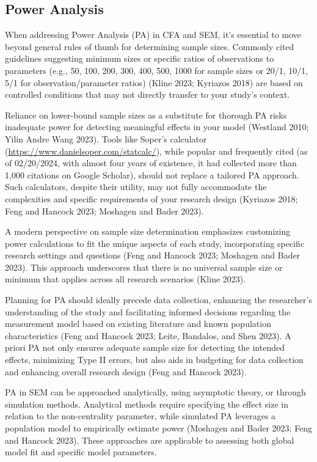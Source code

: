 \documentclass[
  a4paper,
]{article}
\begin{document}
\subsection{Power Analysis}\label{power-analysis}

When addressing Power Analysis (PA) in CFA and SEM, it's essential to
move beyond general rules of thumb for determining sample sizes.
Commonly cited guidelines suggesting minimum sizes or specific ratios of
observations to parameters (e.g., 50, 100, 200, 300, 400, 500, 1000 for
sample sizes or 20/1, 10/1, 5/1 for observation/parameter ratios) (Kline
2023; Kyriazos 2018) are based on controlled conditions that may not
directly transfer to your study's context.

Reliance on lower-bound sample sizes as a substitute for thorough PA
risks inadequate power for detecting meaningful effects in your model
(Westland 2010; Yilin Andre Wang 2023). Tools like Soper's calculator
(\url{https://www.danielsoper.com/statcalc/}), while popular and
frequently cited (as of 02/20/2024, with almost four years of existence,
it had collected more than 1,000 citations on Google Scholar), should
not replace a tailored PA approach. Such calculators, despite their
utility, may not fully accommodate the complexities and specific
requirements of your research design (Kyriazos 2018; Feng and Hancock
2023; Moshagen and Bader 2023).

A modern perspective on sample size determination emphasizes customizing
power calculations to fit the unique aspects of each study,
incorporating specific research settings and questions (Feng and Hancock
2023; Moshagen and Bader 2023). This approach underscores that there is
no universal sample size or minimum that applies across all research
scenarios (Kline 2023).

Planning for PA should ideally precede data collection, enhancing the
researcher's understanding of the study and facilitating informed
decisions regarding the measurement model based on existing literature
and known population characteristics (Feng and Hancock 2023; Leite,
Bandalos, and Shen 2023). A priori PA not only ensures adequate sample
size for detecting the intended effects, minimizing Type II errors, but
also aids in budgeting for data collection and enhancing overall
research design (Feng and Hancock 2023).

PA in SEM can be approached analytically, using asymptotic theory, or
through simulation methods. Analytical methods require specifying the
effect size in relation to the non-centrality parameter, while simulated
PA leverages a population model to empirically estimate power (Moshagen
and Bader 2023; Feng and Hancock 2023). These approaches are applicable
to assessing both global model fit and specific model parameters.
\end{document}

